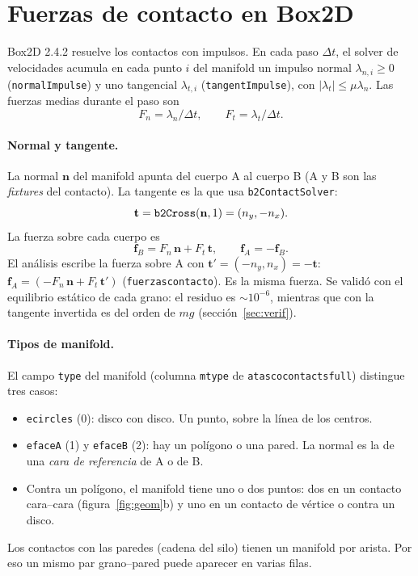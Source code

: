 \documentclass[11pt,a4paper]{article}
\newcommand{\vect}[1]{\mathbf{#1}}
\newcommand{\n}{\vect{n}}
\newcommand{\tv}{\vect{t}}
\newcommand{\f}{\vect{f}}
\newcommand{\codeus}{\textunderscore\allowbreak}
\newcommand{\code}[1]{\texttt{\begingroup\let\_\codeus#1\endgroup}}
\begin{document}
\section{Fuerzas de contacto en Box2D}
\label{sec:box2d}

Box2D 2.4.2 resuelve los contactos con impulsos. En cada paso $\Delta t$,
el solver de velocidades acumula en cada punto $i$ del manifold un impulso
normal $\lambda_{n,i} \ge 0$ (\code{normalImpulse}) y uno tangencial
$\lambda_{t,i}$ (\code{tangentImpulse}), con $|\lambda_t| \le \mu
\lambda_n$. Las fuerzas medias durante el paso son
\begin{equation}
  F_n = \lambda_n/\Delta t, \qquad F_t = \lambda_t/\Delta t .
\end{equation}

\paragraph{Normal y tangente.} La normal $\n$ del manifold apunta del
cuerpo A al cuerpo B (A y B son las \emph{fixtures} del contacto). La
tangente es la que usa \code{b2ContactSolver}:
\begin{equation}
  \tv = \code{b2Cross}(\n, 1) = (n_y, -n_x).
\end{equation}
La fuerza sobre cada cuerpo es
\begin{equation}
  \f_B = F_n\,\n + F_t\,\tv, \qquad \f_A = -\f_B .
  \label{eq:fuerza}
\end{equation}
El análisis escribe la fuerza sobre A con $\tv' = (-n_y, n_x) = -\tv$:
$\f_A = (-F_n\,\n + F_t\,\tv')$ (\code{fuerzas\_contacto}). Es la misma
fuerza. Se validó con el equilibrio estático de cada grano: el residuo es
$\sim 10^{-6}$, mientras que con la tangente invertida es del orden de
$mg$ (sección~\ref{sec:verif}).

\paragraph{Tipos de manifold.} El campo \code{type} del manifold (columna
\code{mtype} de \code{atasco\_contacts\_full}) distingue tres casos:
\begin{itemize}
  \item \code{e\_circles} (0): disco con disco. Un punto, sobre la línea
    de los centros.
  \item \code{e\_faceA} (1) y \code{e\_faceB} (2): hay un polígono o una
    pared. La normal es la de una \emph{cara de referencia} de A o de B.
  \item Contra un polígono, el manifold tiene uno o dos puntos: dos en un
    contacto cara--cara (figura~\ref{fig:geom}b) y uno en un contacto de
    vértice o contra un disco.
\end{itemize}
Los contactos con las paredes (cadena del silo) tienen un manifold por
arista. Por eso un mismo par grano--pared puede aparecer en varias filas.
\end{document}
